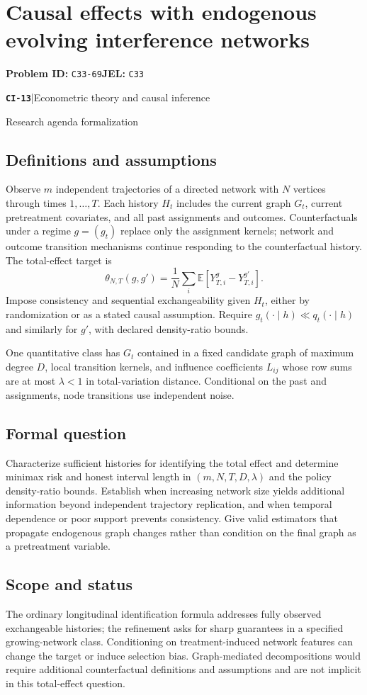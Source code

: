 \documentclass[11pt,a4paper]{article}
\newcommand{\E}{\mathbb E}
\newcommand{\entrymeta}[3]{{\sffamily\small\color{muted}\textbf{\texttt{#1}}\quad|\quad #2\par #3\par}}
\begin{document}
\section*{Causal effects with endogenous evolving interference networks}
\textbf{Problem ID:} \texttt{C33-69}\quad \textbf{JEL:} \texttt{C33}\par
\label{problem:OP-0492}
\label{beyond:CI-13}
\entrymeta{CI-13}{Econometric theory and causal inference}{Research agenda formalization}
\subsection*{Definitions and assumptions}
Observe $m$ independent trajectories of a directed network with $N$ vertices through times $1,\ldots,T$. Each history $H_t$ includes the current graph $G_t$, current pretreatment covariates, and all past assignments and outcomes. Counterfactuals under a regime $g=(g_t)$ replace only the assignment kernels; network and outcome transition mechanisms continue responding to the counterfactual history. The total-effect target is
\[
\theta_{N,T}(g,g')=\frac1N\sum_i
 \E[Y_{T,i}^{g}-Y_{T,i}^{g'}].
\]
Impose consistency and sequential exchangeability given $H_t$, either by randomization or as a stated causal assumption. Require $g_t(\cdot\mid h)\ll q_t(\cdot\mid h)$ and similarly for $g'$, with declared density-ratio bounds.

One quantitative class has $G_t$ contained in a fixed candidate graph of maximum degree $D$, local transition kernels, and influence coefficients $L_{ij}$ whose row sums are at most $\lambda<1$ in total-variation distance. Conditional on the past and assignments, node transitions use independent noise.
\subsection*{Formal question}
Characterize sufficient histories for identifying the total effect and determine minimax risk and honest interval length in $(m,N,T,D,\lambda)$ and the policy density-ratio bounds. Establish when increasing network size yields additional information beyond independent trajectory replication, and when temporal dependence or poor support prevents consistency. Give valid estimators that propagate endogenous graph changes rather than condition on the final graph as a pretreatment variable.
\subsection*{Scope and status}
The ordinary longitudinal identification formula addresses fully observed exchangeable histories; the refinement asks for sharp guarantees in a specified growing-network class. Conditioning on treatment-induced network features can change the target or induce selection bias. Graph-mediated decompositions would require additional counterfactual definitions and assumptions and are not implicit in this total-effect question.
\end{document}
